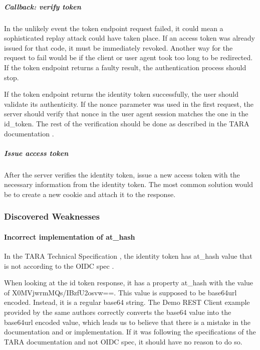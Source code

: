 \subparagraph{Callback: verify token}

In the unlikely event the token endpoint request failed, it could mean a sophisticated replay attack could have taken place. If an access token was already issued for that code, it must be immediately revoked. Another way for the request to fail would be if the client or user agent took too long to be redirected. If the token endpoint returns a faulty result, the authentication process should stop.

If the token endpoint returns the identity token successfully, the user should validate its authenticity. If the nonce parameter was used in the first request, the server should verify that nonce in the user agent session matches the one in the id\_token. The rest of the verification should be done as described in the TARA documentation \cite{tara-technical}.


\subparagraph{Issue access token}

After the server verifies the identity token, issue a new access token with the necessary information from the identity token. The most common solution would be to create a new cookie and attach it to the response.

\subsubsection{Discovered Weaknesses}

\paragraph{Incorrect implementation of at\_hash}

In the TARA Technical Specification \cite{tara-technical}, the identity token has at\_hash value that is not according to the OIDC spec \cite{oidc}.

When looking at the id token response, it has a property at\_hash with the value of {X0MVjwrmMQs/IBzfU2osvw==}. This value is supposed to be base64url encoded. Instead, it is a regular base64 string. The Demo REST Client example provided by the same authors \cite{tara-demorest} correctly converts the base64 value into the base64url encoded value, which leads us to believe that there is a mistake in the documentation and or implementation. If it was following the specifications of the TARA documentation and not OIDC spec, it should have no reason to do so.

